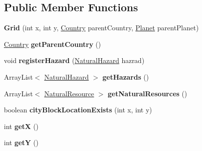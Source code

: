 \subsection*{Public Member Functions}
\begin{DoxyCompactItemize}
\item 
{\bfseries Grid} (int x, int y, \hyperlink{classplanets_1_1_country}{Country} parent\+Country, \hyperlink{classplanets_1_1_planet}{Planet} parent\+Planet)\hypertarget{classplanets_1_1_grid_ae423e67404307f4610ac6d6a7412d8cb}{}\label{classplanets_1_1_grid_ae423e67404307f4610ac6d6a7412d8cb}

\item 
\hyperlink{classplanets_1_1_country}{Country} {\bfseries get\+Parent\+Country} ()\hypertarget{classplanets_1_1_grid_af515d59d73ae58e210514bfd0755280e}{}\label{classplanets_1_1_grid_af515d59d73ae58e210514bfd0755280e}

\item 
void {\bfseries register\+Hazard} (\hyperlink{classplanets_1_1_natural_hazard}{Natural\+Hazard} hazrad)\hypertarget{classplanets_1_1_grid_ac10589d0074e0be40fa339b609f21f0c}{}\label{classplanets_1_1_grid_ac10589d0074e0be40fa339b609f21f0c}

\item 
Array\+List$<$ \hyperlink{classplanets_1_1_natural_hazard}{Natural\+Hazard} $>$ {\bfseries get\+Hazards} ()\hypertarget{classplanets_1_1_grid_aef588f6efe65f85fc46ea59e552ba208}{}\label{classplanets_1_1_grid_aef588f6efe65f85fc46ea59e552ba208}

\item 
Array\+List$<$ \hyperlink{classplanets_1_1_natural_resource}{Natural\+Resource} $>$ {\bfseries get\+Natural\+Resources} ()\hypertarget{classplanets_1_1_grid_a853ed48fa93be42c0cc4286bfc85b315}{}\label{classplanets_1_1_grid_a853ed48fa93be42c0cc4286bfc85b315}

\item 
boolean {\bfseries city\+Block\+Location\+Exists} (int x, int y)\hypertarget{classplanets_1_1_grid_a206752b285a39030be6d6390e407536a}{}\label{classplanets_1_1_grid_a206752b285a39030be6d6390e407536a}

\item 
int {\bfseries getX} ()\hypertarget{classplanets_1_1_grid_abc92193e8f7bc525fa15ad73e525ec2e}{}\label{classplanets_1_1_grid_abc92193e8f7bc525fa15ad73e525ec2e}

\item 
int {\bfseries getY} ()\hypertarget{classplanets_1_1_grid_a3b9021489e5d3d236479e63b93df793a}{}\label{classplanets_1_1_grid_a3b9021489e5d3d236479e63b93df793a}


\end{DoxyCompactItemize}
